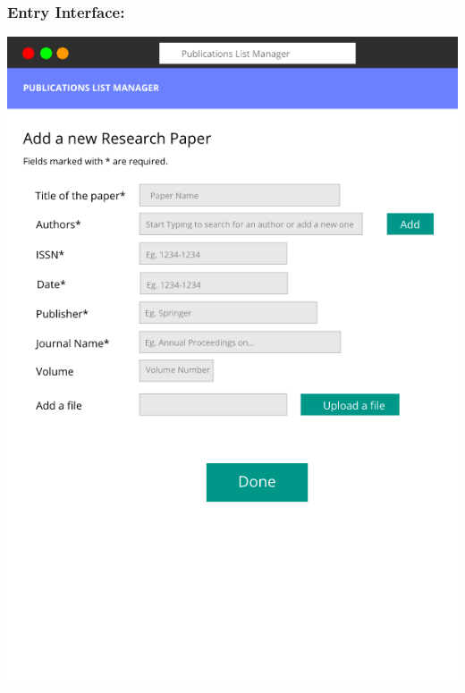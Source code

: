 \documentclass[12pt]{extarticle}
\begin{document}
		\subsubsection{Entry Interface:}
		\vspace{10mm}
			\includegraphics[scale=.7]{entry_form_interface}
\end{document}
